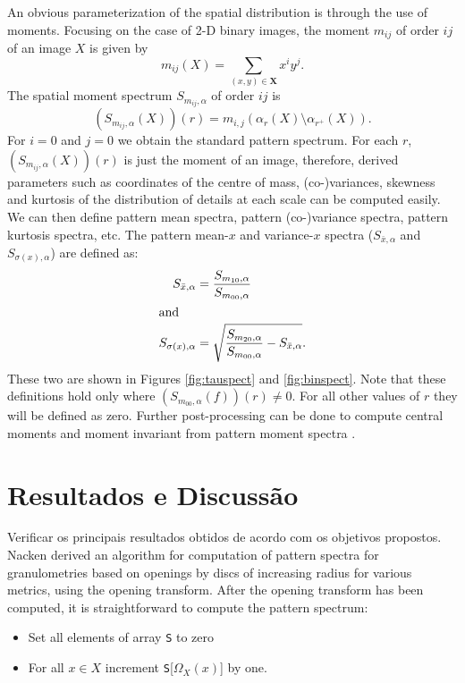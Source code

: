 \documentclass{sciposter}
\begin{document}
\begin{multicols}{3}
An obvious parameterization of the spatial distribution is through 
the use of moments. Focusing on the case of 2-D binary images, the 
moment $m_{ij}$ of order $ij$ of an image $X$ is given by
\begin{equation}
  m_{ij}(X) = \sum_{(x,y) \in \mathbf X} x^i y^j.
\end{equation}  
The spatial moment spectrum $S_{m_{ij},\alpha}$ of order $ij$ is
\begin{equation}
  (S_{m_{ij},\alpha}(X))(r) = m_{i,j}(\alpha_r(X) \setminus \alpha_{r^+}(X)).
\end{equation}  
For $i=0$ and $j=0$ we obtain the standard pattern spectrum. 
For each $r$, $(S_{m_{ij},\alpha}(X))(r)$ is just the moment of an image, 
therefore, derived parameters such as coordinates of the centre of mass, 
(co-)variances, skewness and kurtosis of the distribution of details at each
scale can be computed easily. We can then define pattern mean
spectra, pattern (co-)variance spectra, pattern kurtosis spectra, etc. The 
pattern mean-$x$ and variance-$x$ spectra 
($S_{\bar x,\alpha}$ and $S_{\sigma(x),\alpha}$) are defined as: 
\begin{align}
  S_{\bar x,\alpha} & = \frac{S_{m_{10},\alpha}} {S_{m_{00},\alpha}} \\
\intertext{and}
   S_{\sigma(x),\alpha} & = \sqrt{\frac{S_{m_{20},\alpha}}
                                 {S_{m_{00},\alpha}} 
                                 - S_{\bar x, \alpha}}.  
 \end{align}
These two are shown in Figures \ref{fig:tauspect} and \ref{fig:binspect}. Note that 
these definitions hold only where $(S_{m_{00},\alpha}(f))(r) \neq 0$. For all 
other values of $r$ they will be defined as zero. Further post-processing can
be done to compute central moments and moment invariant from pattern moment 
spectra \cite{Flusser:Suk:93,Hu:62}. 

\section{Resultados e Discussão}

Verificar os principais resultados obtidos de acordo com os objetivos propostos.\\

Nacken \cite{Nacken:thesis} derived an algorithm for computation
of pattern spectra for granulometries based on openings by discs of increasing
radius for various metrics, using the opening transform. After the
opening transform has been computed, it is straightforward to compute the 
pattern spectrum:
\begin{itemize}
\item Set all elements of array {\tt S} to zero
\item For all $x \in X$ increment {\tt S}[$\Omega_X(x)$] by one. 
\end{itemize}


\end{multicols}
\end{document}
